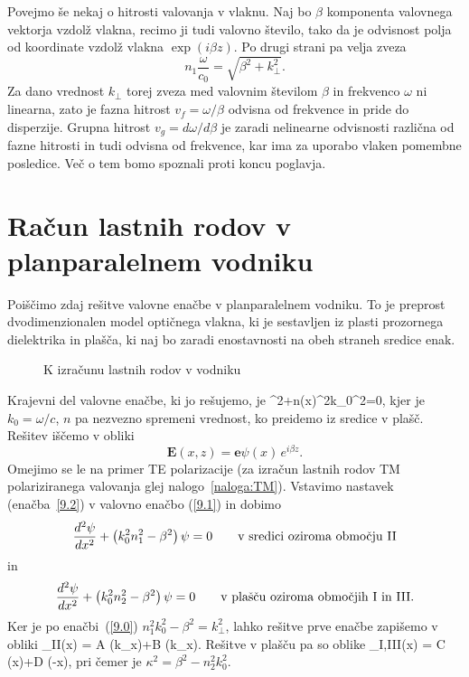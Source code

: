 Povejmo še nekaj o hitrosti valovanja v vlaknu.
Naj bo $\beta$ komponenta valovnega vektorja vzdolž
vlakna, recimo ji tudi valovno število, tako da je odvisnost polja
od koordinate vzdolž vlakna $\exp (i\beta z)$. Po drugi strani pa velja
zveza
\begin{equation}
n_{1}\frac{\omega}{c_0}=\sqrt{\beta^{2}+k_{\perp}^{2}}
\label{9.0}.
\end{equation}
Za dano vrednost $k_{\perp}$ torej zveza med valovnim številom $\beta$
in frekvenco $\omega$ ni linearna, zato je fazna hitrost $v_{f}=\omega/\beta$
odvisna od frekvence in pride do disperzije. Grupna hitrost $v_{g}=d\omega/d\beta$ 
je zaradi nelinearne odvisnosti različna od fazne hitrosti in tudi odvisna od 
frekvence, kar ima za uporabo vlaken pomembne posledice. Več o tem bomo spoznali 
proti koncu poglavja. 

\section{Račun lastnih rodov v planparalelnem vodniku}
Poiščimo zdaj rešitve valovne enačbe v planparalelnem vodniku. 
To je preprost dvodimenzionalen model optičnega vlakna, ki je sestavljen iz 
plasti prozornega dielektrika in plašča, ki naj bo zaradi enostavnosti na obeh 
straneh sredice enak. 
\begin{figure}[h]
\centering
\def\svgwidth{120truemm} 

\caption{K izračunu lastnih rodov v vodniku}
\label{fig:vodnikracun}
\end{figure}

Krajevni del valovne enačbe, ki jo rešujemo,
je
\beq
\nabla^{2}+n\left(x\right)^{2}k_{0}^{2}=0,
\label{9.1}
\eeq
kjer je $k_{0}=\omega/c$, $n$ pa nezvezno spremeni vrednost, ko preidemo iz sredice v plašč. 
Rešitev iščemo v obliki 
\begin{equation}
{\mathbf E}(x,z)=\mathbf{e}\psi\left(x\right)\, e^{i\beta z}.
\label{9.2}
\end{equation}
Omejimo se le na primer TE polarizacije (za izračun lastnih rodov TM polariziranega
valovanja glej nalogo~\ref{naloga:TM}). Vstavimo nastavek (enačba~\ref{9.2}) v valovno enačbo
(\ref{9.1}) in dobimo
\begin{equation}
\frac{d^{2}{\bf \psi}}{dx^{2}}+\left(k_{0}^{2}n_1^{2}-\beta^{2}\right){\bf \psi}=0
\qquad \textrm{v sredici oziroma obmo\v cju II} 
\label{9.3}
\end{equation}
in 
\begin{equation}
\frac{d^{2}{\bf \psi}}{dx^{2}}+\left(k_{0}^{2}n_2^{2}-\beta^{2}\right){\bf \psi}=0
\qquad \textrm{v plašču oziroma obmo\v cjih I in III.} 
\label{9.3}
\end{equation}
Ker je po enačbi~(\ref{9.0}) $n_1^2k_0^2-\beta^2=k_\perp^2$, lahko rešitve prve enačbe
zapišemo v obliki
\beq
\psi_{II}(x) = A \cos(k_\perp x)+B \sin(k_\perp x).
\eeq
Rešitve v plašču pa so oblike
\beq
\psi_{I,III}(x) = C \exp(\kappa x)+D \exp(-\kappa x),
\eeq
pri čemer je $\kappa^2= \beta^2-n_2^2k_0^2$.

